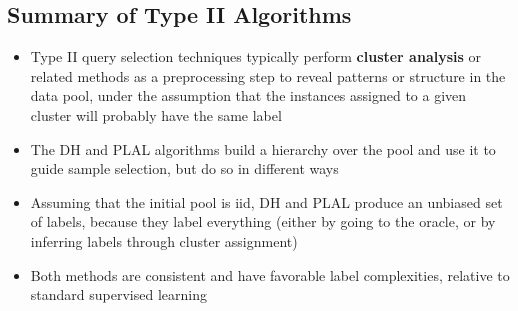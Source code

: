 \documentclass[10pt]{article}
\begin{document}
\subsection*{Summary of Type II Algorithms}
\begin{itemize}
	\item Type II query selection techniques typically perform \textbf{cluster analysis} or related methods as a preprocessing step to reveal patterns or structure in the data pool, under the assumption that the instances assigned to a given cluster will probably have the same label
	\item The DH and PLAL algorithms build a hierarchy over the pool and use it to guide sample selection, but do so in different ways
    \item Assuming that the initial pool is iid, DH and PLAL produce an unbiased set of labels, because they label everything (either by going to the oracle, or by inferring labels through cluster assignment)
    \item Both methods are consistent and have favorable label complexities, relative to standard supervised learning
\end{itemize}
\end{document}
